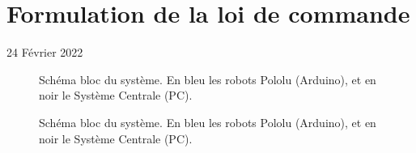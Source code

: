 \section{Formulation de la loi de commande}

\begin{flushright}
24 Février 2022
\end{flushright}

\begin{figure}[h!]
    \centering
    
    \caption{Schéma bloc du système. En bleu les robots Pololu (Arduino), et en noir le Système Centrale (PC).}
    \label{fig:formulation_commande}
\end{figure}

\begin{figure}[h!]
    \centering
    
    \caption{Schéma bloc du système. En bleu les robots Pololu (Arduino), et en noir le Système Centrale (PC).}
    \label{fig:formulation_commande}
\end{figure}